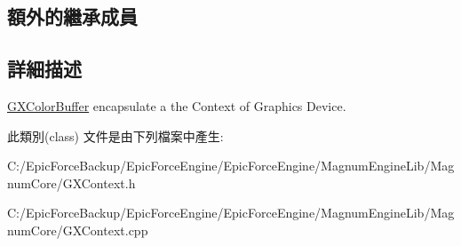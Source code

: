 \subsection*{額外的繼承成員}


\subsection{詳細描述}
\hyperlink{class_magnum_1_1_g_x_color_buffer}{G\+X\+Color\+Buffer} encapsulate a the Context of Graphics Device. 

此類別(class) 文件是由下列檔案中產生\+:\begin{DoxyCompactItemize}
\item 
C\+:/\+Epic\+Force\+Backup/\+Epic\+Force\+Engine/\+Epic\+Force\+Engine/\+Magnum\+Engine\+Lib/\+Magnum\+Core/G\+X\+Context.\+h\item 
C\+:/\+Epic\+Force\+Backup/\+Epic\+Force\+Engine/\+Epic\+Force\+Engine/\+Magnum\+Engine\+Lib/\+Magnum\+Core/G\+X\+Context.\+cpp\end{DoxyCompactItemize}
